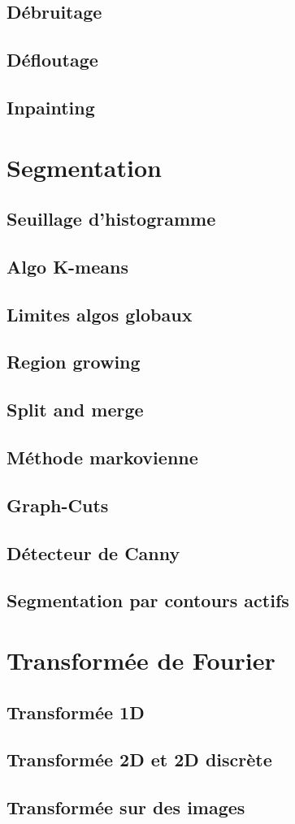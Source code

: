 \documentclass[french]{article}
\begin{document}
\subsection{Débruitage}
\subsection{Défloutage}
\subsection{Inpainting}

\section{Segmentation}
\subsection{Seuillage d'histogramme}
\subsection{Algo K-means}
\subsection{Limites algos globaux}
\subsection{Region growing}
\subsection{Split and merge}
\subsection{Méthode markovienne}
\subsection{Graph-Cuts}
\subsection{Détecteur de Canny}
\subsection{Segmentation par contours actifs}

\section{Transformée de Fourier}
\subsection{Transformée 1D}
\subsection{Transformée 2D et 2D discrète}
\subsection{Transformée sur des images}
\end{document}
